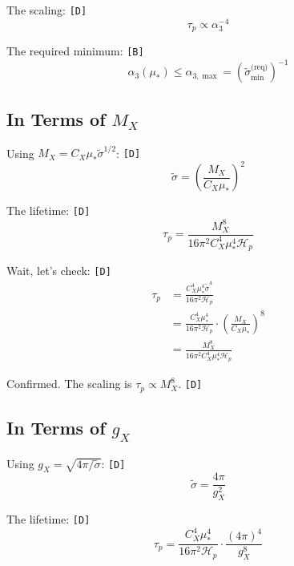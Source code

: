 \documentclass[11pt,a4paper]{article}
\newcommand{\tagD}{\textcolor{green!50!black}{\texttt{[D]}}}
\newcommand{\tagB}{\textcolor{purple!70!black}{\texttt{[B]}}}
\theoremstyle{definition}
\begin{document}
The scaling: \tagD{}
\begin{equation}
\label{eq:alpha3-scale}
\tau_p \propto \alpha_3^{-4}
\end{equation}

The required minimum: \tagB{}
\begin{equation}
\label{eq:alpha3-max}
\alpha_3(\mu_*) \leq \alpha_{3,\max} = (\tilde{\sigma}_{\min}^{\text{(req)}})^{-1}
\end{equation}

\subsection{In Terms of $M_X$}
\label{subsec:mx-param}

Using $M_X = C_X \mu_* \tilde{\sigma}^{1/2}$: \tagD{}
\begin{equation}
\label{eq:alt-mx}
\tilde{\sigma} = \left(\frac{M_X}{C_X \mu_*}\right)^2
\end{equation}

The lifetime: \tagD{}
\begin{equation}
\label{eq:mx-tau}
\tau_p = \frac{M_X^8}{16\pi^2 C_X^4 \mu_*^4 \mathcal{H}_p}
\end{equation}

Wait, let's check: \tagD{}
\begin{align}
\label{eq:mx-check-1}
\tau_p &= \frac{C_X^4 \mu_*^4 \tilde{\sigma}^4}{16\pi^2 \mathcal{H}_p} \\
\label{eq:mx-check-2}
&= \frac{C_X^4 \mu_*^4}{16\pi^2 \mathcal{H}_p} \cdot \left(\frac{M_X}{C_X\mu_*}\right)^8 \\
\label{eq:mx-check-3}
&= \frac{M_X^8}{16\pi^2 C_X^4 \mu_*^4 \mathcal{H}_p}
\end{align}

Confirmed. The scaling is $\tau_p \propto M_X^8$. \tagD{}

\subsection{In Terms of $g_X$}
\label{subsec:gx-param}

Using $g_X = \sqrt{4\pi/\tilde{\sigma}}$: \tagD{}
\begin{equation}
\label{eq:alt-gx}
\tilde{\sigma} = \frac{4\pi}{g_X^2}
\end{equation}

The lifetime: \tagD{}
\begin{equation}
\label{eq:gx-tau}
\tau_p = \frac{C_X^4 \mu_*^4}{16\pi^2 \mathcal{H}_p} \cdot \frac{(4\pi)^4}{g_X^8}
\end{equation}
\end{document}
